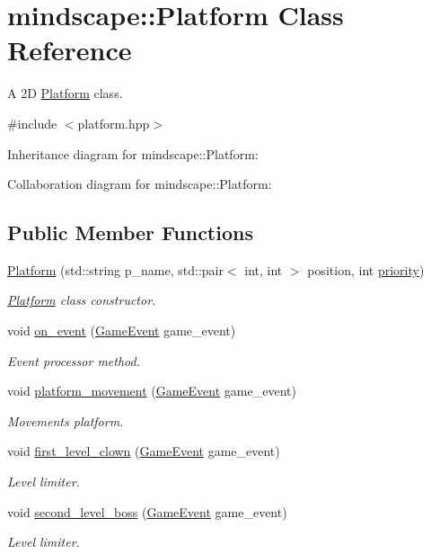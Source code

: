 \hypertarget{classmindscape_1_1_platform}{}\section{mindscape\+:\+:Platform Class Reference}
\label{classmindscape_1_1_platform}


A 2D \hyperlink{classmindscape_1_1_platform}{Platform} class.  




{\ttfamily \#include $<$platform.\+hpp$>$}



Inheritance diagram for mindscape\+:\+:Platform\+:


Collaboration diagram for mindscape\+:\+:Platform\+:
\subsection*{Public Member Functions}
\begin{DoxyCompactItemize}
\item 
\hyperlink{classmindscape_1_1_platform_aebeb96487bd3261d8c9c1046aa225630}{Platform} (std\+::string p\+\_\+name, std\+::pair$<$ int, int $>$ position, int \hyperlink{classengine_1_1_game_object_a159ecaca30229e302793b11a75bd13c2}{priority})
\begin{DoxyCompactList}\small\item\em \hyperlink{classmindscape_1_1_platform}{Platform} class constructor. \end{DoxyCompactList}\item 
void \hyperlink{classmindscape_1_1_platform_a6216741f82664014836e0d8a44a6cf9b}{on\+\_\+event} (\hyperlink{class_game_event}{Game\+Event} game\+\_\+event)
\begin{DoxyCompactList}\small\item\em Event processor method. \end{DoxyCompactList}\item 
void \hyperlink{classmindscape_1_1_platform_a9a545e1091d12a3a9f7cebeb6677c3e3}{platform\+\_\+movement} (\hyperlink{class_game_event}{Game\+Event} game\+\_\+event)
\begin{DoxyCompactList}\small\item\em Movements platform. \end{DoxyCompactList}\item 
void \hyperlink{classmindscape_1_1_platform_aa90710d3a7fcbe0c09eb8f63c9fbc102}{first\+\_\+level\+\_\+clown} (\hyperlink{class_game_event}{Game\+Event} game\+\_\+event)
\begin{DoxyCompactList}\small\item\em Level limiter. \end{DoxyCompactList}\item 
void \hyperlink{classmindscape_1_1_platform_a358c45de9c2b0c3569abf790cb594f8f}{second\+\_\+level\+\_\+boss} (\hyperlink{class_game_event}{Game\+Event} game\+\_\+event)
\begin{DoxyCompactList}\small\item\em Level limiter. \end{DoxyCompactList}\end{DoxyCompactItemize}

